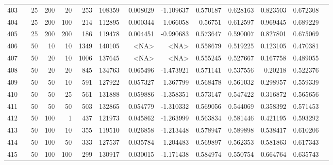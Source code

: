 \begin{longtable}{llrrrrrrrrrrrr}
		403 & &           25 &               200 &           20 &         253 &     108359 &  0.008029 & -1.109637 &  0.570187 &    0.628163 &       0.823503 &  0.672308 \\
		404 & &           25 &               200 &          100 &         214 &     112895 & -0.000344 & -1.066058 &   0.56751 &    0.612597 &       0.969445 &  0.689229 \\
		405 & &           25 &               200 &          200 &         186 &     119478 &  0.004451 & -0.990683 &  0.573647 &    0.590007 &       0.827801 &  0.675069 \\
		406 & &           50 &                10 &           10 &           1349 &     140105 &      <NA> &      <NA> &  0.558679 &    0.519225 &       0.123105 &  0.470381 \\
		407 & &           50 &                20 &           10 &           1006 &     137645 &      <NA> &      <NA> &  0.555245 &    0.527667 &       0.167758 &  0.489055 \\
		408 & &           50 &                20 &           20 &         845 &     134763 &  0.065496 & -1.473921 &  0.571141 &    0.537556 &        0.20218 &  0.522376 \\
		409 & &           50 &                50 &           10 &         591 &     127922 &  0.057327 & -1.367799 &  0.568478 &    0.561032 &       0.298957 &  0.559339 \\
		410 & &           50 &                50 &           25 &         561 &     131888 &  0.059886 & -1.358351 &  0.573147 &    0.547422 &       0.316872 &  0.565656 \\
		411 & &           50 &                50 &           50 &         503 &     132865 &  0.054779 & -1.310332 &  0.569056 &    0.544069 &       0.358392 &  0.571453 \\
		412 & &           50 &               100 &            1 &         437 &     121973 &  0.045862 & -1.263999 &  0.563834 &    0.581446 &       0.421195 &  0.593292 \\
		413 & &           50 &               100 &           10 &         355 &     119510 &  0.026858 & -1.213448 &  0.578947 &    0.589898 &       0.538417 &  0.610206 \\
		414 & &           50 &               100 &           50 &         333 &     127537 &  0.035784 & -1.204483 &  0.569897 &    0.562353 &       0.581863 &  0.617343 \\
		415 & &           50 &               100 &          100 &         299 &     130917 &  0.030015 & -1.171438 &  0.584974 &    0.550754 &       0.664764 &  0.635743 \\

\end{longtable}
